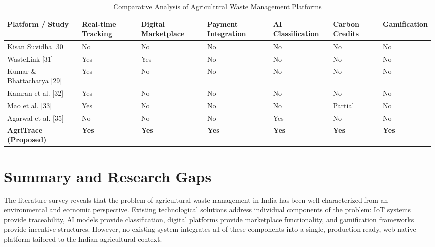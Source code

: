 \documentclass[a4paper,12pt,oneside]{report}
\begin{document}
\begin{table}[h!]
\centering
\caption{Comparative Analysis of Agricultural Waste Management Platforms}
\label{tab:lit-comparison}
\begin{tabular}{|p{2.8cm}|p{1.6cm}|p{1.5cm}|p{1.4cm}|p{1.4cm}|p{1.5cm}|p{1.4cm}|}
\hline
\textbf{Platform / Study} & \textbf{Real-time Tracking} & \textbf{Digital Marketplace} & \textbf{Payment Integration} & \textbf{AI Classification} & \textbf{Carbon Credits} & \textbf{Gamification} \\
\hline
Kisan Suvidha [30] & No & No & No & No & No & No \\
\hline
WasteLink [31] & Yes & Yes & No & No & No & No \\
\hline
Kumar \& Bhattacharya [29] & Yes & No & No & No & No & No \\
\hline
Kamran et al. [32] & Yes & No & No & No & No & No \\
\hline
Mao et al. [33] & Yes & No & No & No & Partial & No \\
\hline
Agarwal et al. [35] & No & No & No & Yes & No & No \\
\hline
\textbf{AgriTrace (Proposed)} & \textbf{Yes} & \textbf{Yes} & \textbf{Yes} & \textbf{Yes} & \textbf{Yes} & \textbf{Yes} \\
\hline
\end{tabular}
\end{table}

\section{Summary and Research Gaps}

\noindent The literature survey reveals that the problem of agricultural waste management in India has been well-characterized from an environmental and economic perspective. Existing technological solutions address individual components of the problem: IoT systems provide traceability, AI models provide classification, digital platforms provide marketplace functionality, and gamification frameworks provide incentive structures. However, no existing system integrates all of these components into a single, production-ready, web-native platform tailored to the Indian agricultural context.
\end{document}
